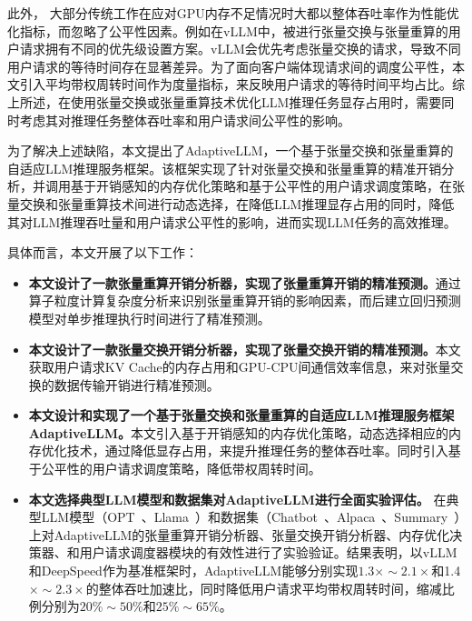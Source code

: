 
此外， 大部分传统工作在应对GPU内存不足情况时大都以整体吞吐率作为性能优化指标，而忽略了公平性因素。例如在vLLM中，被进行张量交换与张量重算的用户请求拥有不同的优先级设置方案。vLLM会优先考虑张量交换的请求，导致不同用户请求的等待时间存在显著差异。为了面向客户端体现请求间的调度公平性，本文引入平均带权周转时间作为度量指标，来反映用户请求的等待时间平均占比。综上所述，在使用张量交换或张量重算技术优化LLM推理任务显存占用时，需要同时考虑其对推理任务整体吞吐率和用户请求间公平性的影响。

为了解决上述缺陷，本文提出了AdaptiveLLM，一个基于张量交换和张量重算的自适应LLM推理服务框架。该框架实现了针对张量交换和张量重算的精准开销分析，并调用基于开销感知的内存优化策略和基于公平性的用户请求调度策略，在张量交换和张量重算技术间进行动态选择，在降低LLM推理显存占用的同时，降低其对LLM推理吞吐量和用户请求公平性的影响，进而实现LLM任务的高效推理。

具体而言，本文开展了以下工作：

\begin{itemize}

    \item \textbf{本文设计了一款张量重算开销分析器，实现了张量重算开销的精准预测。}通过算子粒度计算复杂度分析来识别张量重算开销的影响因素，而后建立回归预测模型对单步推理执行时间进行了精准预测。
    
    \item \textbf{本文设计了一款张量交换开销分析器，实现了张量交换开销的精准预测。}本文获取用户请求KV Cache的内存占用和GPU-CPU间通信效率信息，来对张量交换的数据传输开销进行精准预测。

    \item \textbf{本文设计和实现了一个基于张量交换和张量重算的自适应LLM推理服务框架AdaptiveLLM。}本文引入基于开销感知的内存优化策略，动态选择相应的内存优化技术，通过降低显存占用，来提升推理任务的整体吞吐率。同时引入基于公平性的用户请求调度策略，降低带权周转时间。
    
    \item \textbf{本文选择典型LLM模型和数据集对AdaptiveLLM进行全面实验评估。} 在典型LLM模型（OPT~\cite{OPT}、Llama~\cite{Llama}）和数据集（Chatbot~\cite{Chatbot}、Alpaca~\cite{Alpaca}、Summary~\cite{Summary}）上对AdaptiveLLM的张量重算开销分析器、张量交换开销分析器、内存优化决策器、和用户请求调度器模块的有效性进行了实验验证。结果表明，以vLLM和DeepSpeed作为基准框架时，AdaptiveLLM能够分别实现$1.3\times\sim2.1\times$和1.4$\times\sim2.3\times$的整体吞吐加速比，同时降低用户请求平均带权周转时间，缩减比例分别为$20\%\sim50\%$和$25\%\sim65\%$。

\end{itemize}